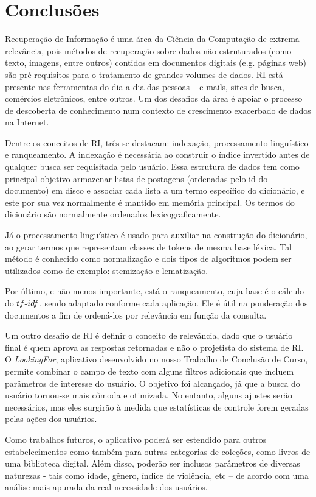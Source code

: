 \chapter{Conclusões}
\label{cap:conclusoes}

Recuperação de Informação é uma área da Ciência da Computação de extrema relevância, pois métodos de recuperação sobre dados não-estruturados (como texto, imagens, entre outros) contidos em documentos digitais (e.g. páginas web) são pré-requisitos para o tratamento de grandes volumes de dados. RI está presente nas ferramentas do dia-a-dia das pessoas – e-mails, sites de busca, comércios eletrônicos, entre outros. Um dos desafios da área é apoiar o processo de descoberta de conhecimento num contexto de crescimento exacerbado de dados na Internet.

Dentre os conceitos de RI, três se destacam: indexação, processamento linguístico e ranqueamento. A indexação é necessária ao construir o índice invertido antes de qualquer busca ser requisitada pelo usuário. Essa estrutura de dados tem como principal objetivo armazenar listas de postagens (ordenadas pelo id do documento) em disco e associar cada lista a um termo específico do dicionário, e este por sua vez normalmente é mantido em memória principal. Os termos do dicionário são normalmente ordenados lexicograficamente.

Já o processamento linguístico é usado para auxiliar na construção do dicionário, ao gerar termos que representam classes de tokens de mesma base léxica. Tal método é conhecido como normalização e dois tipos de algoritmos podem ser utilizados como de exemplo: stemização e lematização.

Por último, e não menos importante, está o ranqueamento, cuja base é o cálculo do $tf\textnormal{-}idf$, sendo adaptado conforme cada aplicação. Ele é útil na ponderação dos documentos a fim de ordená-los por relevância em função da consulta.

Um outro desafio de RI é definir o conceito de relevância, dado que o usuário final é quem aprova as respostas retornadas e não o projetista do sistema de RI. O \emph{LookingFor}, aplicativo desenvolvido no nosso Trabalho de Conclusão de Curso, permite combinar o campo de texto com alguns filtros adicionais que incluem parâmetros de interesse do usuário. O objetivo foi alcançado, já que a busca do usuário tornou-se mais cômoda e otimizada. No entanto, alguns ajustes serão necessários, mas eles surgirão à medida que estatísticas de controle forem geradas pelas ações dos usuários.

Como trabalhos futuros, o aplicativo poderá ser estendido para outros estabelecimentos como também para outras categorias de coleções, como livros de uma biblioteca digital. Além disso, poderão ser inclusos parâmetros de diversas naturezas - tais como idade, gênero, índice de violência, etc – de acordo com uma análise mais apurada da real necessidade dos usuários.